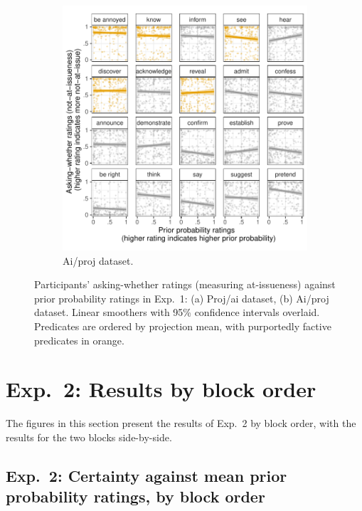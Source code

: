 \documentclass[11pt,fleqn]{article}
\newcommand{\6}{\mbox{$[\hspace*{-.6mm}[$}}
\newcommand{\9}{\mbox{$]\hspace*{-.6mm}]$}}
\begin{document}
\begin{figure}[h!]
\begin{subfigure}[t]{0.49\textwidth}
\includegraphics[width=.9\textwidth]{../../results/exp1/graphs/SUP-aiproj-ai-by-prior}
\caption{Ai/proj dataset.}
 \end{subfigure}
 
  
\caption{Participants' asking-whether ratings (measuring at-issueness) against prior probability ratings in Exp.~1: (a) Proj/ai dataset, (b) Ai/proj dataset. Linear smoothers with 95\% confidence intervals overlaid. Predicates are ordered by projection mean, with purportedly factive predicates in orange.}
\end{figure}

\newpage

\section{Exp.~2: Results by block order}\label{a-blockOrderExp2}

The figures in this section present the results of Exp.~2 by block order, with the results for the two blocks side-by-side.

\subsection{Exp.~2: Certainty against mean prior probability ratings, by block order}
\end{document}
